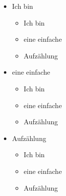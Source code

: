 \documentclass[12pt,ngerman]{scrartcl}
\begin{document}
\begin{itemize}
	\item Ich bin
	\begin{itemize}
		\item Ich bin
		\item eine einfache
		\item Aufzählung
    \end{itemize}

	\item eine einfache
	\begin{itemize}
		\item Ich bin
		\item eine einfache
		\item Aufzählung
	\end{itemize}	

	\item Aufzählung
	\begin{itemize}
		\item Ich bin
		\item eine einfache
		\item Aufzählung
	\end{itemize}

\end{itemize}
\end{document}

